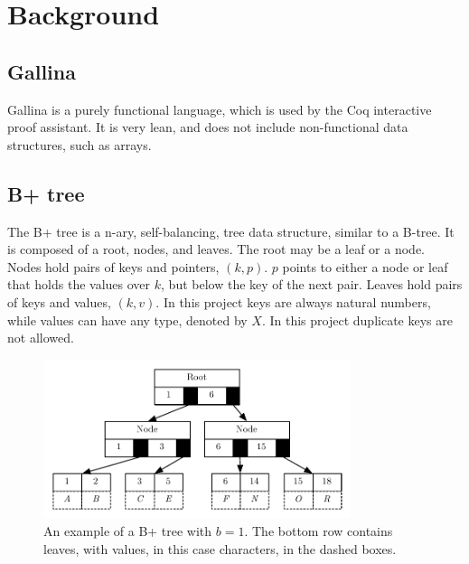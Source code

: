 \section{Background}
\label{sec:Background}

\subsection{Gallina}
Gallina is a purely functional language, which is used by the Coq interactive proof assistant. It is very lean, and does not include non-functional data structures, such as arrays.

\subsection{B+ tree}
The B+ tree is a n-ary, self-balancing, tree data structure, similar to a B-tree. It is composed of a root, nodes, and leaves. The root may be a leaf or a node. Nodes hold pairs of keys and pointers, $(k, p)$. $p$ points to either a node or leaf that holds the values over $k$, but below the key of the next pair. Leaves hold pairs of keys and values, $(k, v)$. In this project keys are always natural numbers, while values can have any type, denoted by $X$. In this project duplicate keys are not allowed.

\begin{figure}
 \centering
   \includegraphics[width=90mm]{diagrams/BPlusTree.pdf}
 \caption{An example of a B+ tree with $b=1$. The bottom row contains leaves, with values, in this case characters, in the dashed boxes.}
 \label{fig:bplustree}
\end{figure}

